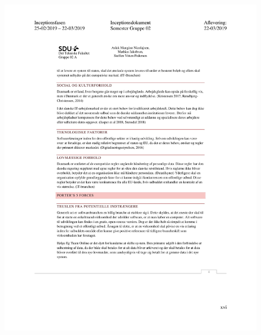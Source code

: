 \begin{figure}[hb]
  \includegraphics[scale = 0.33]{./PNG/Inceptions/Gruppe02+InceptionsDokument-49.jpg} 
\end{figure}

